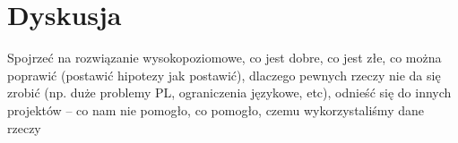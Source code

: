 
\chapter{Dyskusja} %

Spojrzeć na rozwiązanie wysokopoziomowe, co jest dobre, co jest złe, co można poprawić (postawić hipotezy jak postawić), dlaczego pewnych rzeczy nie da się zrobić (np. duże problemy PL, ograniczenia językowe, etc), odnieść się do innych projektów – co nam nie pomogło, co pomogło, czemu wykorzystaliśmy dane rzeczy


